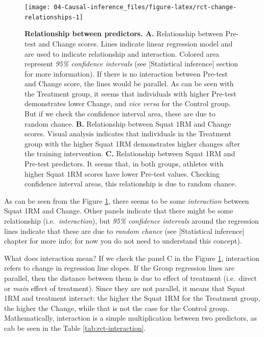 \documentclass[
]{book}
\begin{document}
\begin{figure}

{\centering \texttt{[image: 04-Causal-inference\_files/figure-latex/rct-change-relationships-1]} 

}

\caption{\textbf{Relationship between predictors. A. } Relationship between Pre-test and Change scores. Lines indicate linear regression model and are used to indicate relationship and interaction. Colored area represent \emph{95\% confidence intervals} (see {[}Statistical inference{]} section for more information). If there is no interaction between Pre-test and Change score, the lines would be parallel. As can be seen with the Treatment group, it seems that individuals with higher Pre-test demonstrates lower Change, and \emph{vice versa} for the Control group. But if we check the confidence interval area, these are due to random chance. \textbf{B.} Relationship between Squat 1RM and Change scores. Visual analysis indicates that individuals in the Treatment group with the higher Squat 1RM demonstrates higher changes after the training intervention. \textbf{C.} Relationship between Squat 1RM and Pre-test predictors. It seems that, in both groups, athletes with higher Squat 1RM scores have lower Pre-test values. Checking confidence interval areas, this relationship is due to random chance.}\label{fig:rct-change-relationships}
\end{figure}



As can be seen from the Figure \ref{fig:rct-change-relationships}, there seems to be some \emph{interaction} between Squat 1RM and Change. Other panels indicate that there might be some relationship (i.e.~\emph{interaction}), but \emph{95\% confidence intervals} around the regression lines indicate that these are due to \emph{random chance} (see {[}Statistical inference{]} chapter for more info; for now you do not need to understand this concept).

What does interaction mean? If we check the panel C in the Figure \ref{fig:rct-change-relationships}, interaction refers to change in regression line slopes. If the Group regression lines are parallel, then the distance between them is due to effect of treatment (i.e.~direct or \emph{main} effect of treatment). Since they are not parallel, it means that Squat 1RM and treatment interact: the higher the Squat 1RM for the Treatment group, the higher the Change, while that is not the case for the Control group. Mathematically, interaction is a simple multiplication between two predictors, as cab be seen in the Table \ref{tab:rct-interaction}.
\end{document}
